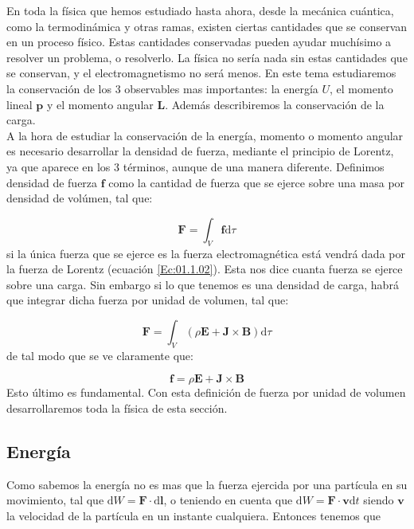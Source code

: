 \documentclass[12pt,a4paper]{article}
\newcommand{\D}{\mathrm{d}}
\newcommand{\Bn}{\mathbf{B}}
\newcommand{\En}{\mathbf{E}}
\newcommand{\Jn}{\mathbf{J}}
\newcommand{\Fn}{\mathbf{F}}
\newcommand{\fn}{\mathbf{f}}
\newcommand{\vn}{\mathbf{v}}
\newcommand{\pn}{\mathbf{p}}
\newcommand{\Ln}{\mathbf{L}}
\newcommand{\lnn}{\mathbf{l}}
\numberwithin{equation}{section}
\numberwithin{figure}{section}
\begin{document}
En toda la física que hemos estudiado hasta ahora, desde la mecánica cuántica, como la termodinámica y otras ramas, existen ciertas cantidades que se conservan en un proceso físico. Estas cantidades conservadas pueden ayudar muchísimo a resolver un problema, o resolverlo. La física no sería nada sin estas cantidades que se conservan, y el electromagnetismo no será menos. En este tema estudiaremos la conservación de los 3 observables mas importantes: la energía $U$, el momento lineal $\pn$ y el momento angular $\Ln$. Además describiremos la conservación de la carga.  \\

A la hora de estudiar la conservación de la energía, momento o momento angular es necesario desarrollar la densidad de fuerza, mediante el principio de Lorentz, ya que aparece en los 3 términos, aunque de una manera diferente. Definimos densidad de fuerza $\fn$ como la cantidad de fuerza que se ejerce sobre una masa por densidad de volúmen, tal que:

\begin{equation}
\Fn = \int_V \fn \D \tau
\end{equation}
si la única fuerza que se ejerce es la fuerza electromagnética está vendrá dada por la fuerza de Lorentz (ecuación \ref{Ec:01.1.02}). Esta nos dice cuanta fuerza se ejerce sobre una carga. Sin embargo si lo que tenemos es una densidad de carga, habrá que integrar dicha fuerza por unidad de volumen, tal que:

\begin{equation}
\Fn = \int_V (\rho \En + \Jn \times \Bn) \D \tau
\end{equation}
de tal modo que se ve claramente que:

\begin{equation}
\fn = \rho \En + \Jn \times \Bn \label{Ec:02.0.03}
\end{equation}
Esto último es fundamental. Con esta definición de fuerza por unidad de volumen desarrollaremos toda la física de esta sección.


\subsection{Energía}

Como sabemos la energía no es mas que la fuerza ejercida por una partícula en su movimiento, tal que $\D W = \Fn \cdot \D \lnn$, o teniendo en cuenta que $\D W = \Fn \cdot \vn \D t$ siendo $\vn$ la velocidad de la partícula en un instante cualquiera. Entonces tenemos que 
\end{document}
